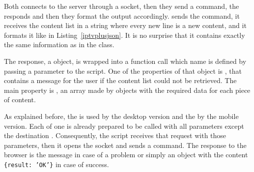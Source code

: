 Both connects to the  server through a socket, then they send a command, the  responds and then they format the output accordingly.
 sends the  command, it receives the content list in a string where every new line is a new content, and it formats it like in Listing~\vref{iptvplusjson}.
It is no surprise that it contains exactly the same information as in the   class.

The response, a  object, is wrapped into a function call which name is defined by passing a parameter to the script.
One of the properties of that object is , that contains a message for the user if the content list could not be retrieved.
The main property is , an array made by objects with the required data for each piece of content.

As explained before, the  is used by the desktop version and the  by the mobile version.
Each of one is already prepared to be called with all parameters except the destination .
Consequently, the  script receives that request with those parameters, then it opens the socket and sends a  command.
The response to the browser is the  message in case of a problem or simply an object with the content \texttt{\{result:~'OK'\}} in case of success.
